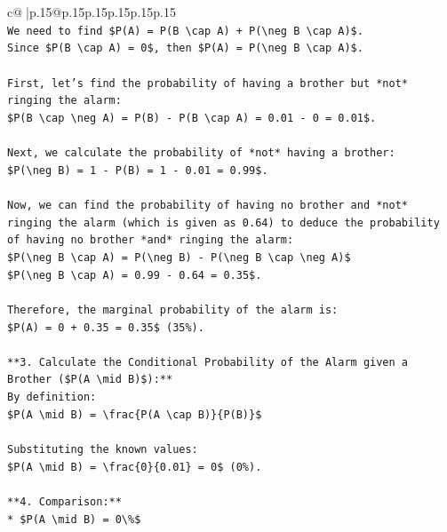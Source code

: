\documentclass{article}
\begin{document}
{\begin{supertabular}{c@{$\;$}|p{.15\linewidth}@{}p{.15\linewidth}p{.15\linewidth}p{.15\linewidth}p{.15\linewidth}p{.15\linewidth}}
{{{\\ 
\texttt{We need to find \$P(A) = P(B \textbackslash{}cap A) + P(\textbackslash{}neg B \textbackslash{}cap A)\$.} \\
\texttt{Since \$P(B \textbackslash{}cap A) = 0\$, then \$P(A) = P(\textbackslash{}neg B \textbackslash{}cap A)\$.} \\
\\ 
\texttt{First, let's find the probability of having a brother but *not* ringing the alarm:} \\
\texttt{\$P(B \textbackslash{}cap \textbackslash{}neg A) = P(B) {-} P(B \textbackslash{}cap A) = 0.01 {-} 0 = 0.01\$.} \\
\\ 
\texttt{Next, we calculate the probability of *not* having a brother:} \\
\texttt{\$P(\textbackslash{}neg B) = 1 {-} P(B) = 1 {-} 0.01 = 0.99\$.} \\
\\ 
\texttt{Now, we can find the probability of having no brother and *not* ringing the alarm (which is given as 0.64) to deduce the probability of having no brother *and* ringing the alarm:} \\
\texttt{\$P(\textbackslash{}neg B \textbackslash{}cap A) = P(\textbackslash{}neg B) {-} P(\textbackslash{}neg B \textbackslash{}cap \textbackslash{}neg A)\$} \\
\texttt{\$P(\textbackslash{}neg B \textbackslash{}cap A) = 0.99 {-} 0.64 = 0.35\$.} \\
\\ 
\texttt{Therefore, the marginal probability of the alarm is:} \\
\texttt{\$P(A) = 0 + 0.35 = 0.35\$ (35\%).} \\
\\ 
\texttt{**3. Calculate the Conditional Probability of the Alarm given a Brother (\$P(A \textbackslash{}mid B)\$):**} \\
\texttt{By definition:} \\
\texttt{\$P(A \textbackslash{}mid B) = \textbackslash{}frac\{P(A \textbackslash{}cap B)\}\{P(B)\}\$} \\
\\ 
\texttt{Substituting the known values:} \\
\texttt{\$P(A \textbackslash{}mid B) = \textbackslash{}frac\{0\}\{0.01\} = 0\$ (0\%).} \\
\\ 
\texttt{**4. Comparison:**} \\
\texttt{*   \$P(A \textbackslash{}mid B) = 0\textbackslash{}\%\$} \\
}}}
\end{supertabular}}
\end{document}
